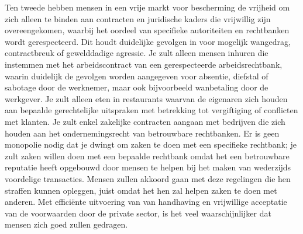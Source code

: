 \documentclass[
  a5paper,
  smalldemyvopaper,11pt,twoside,onecolumn,openright,extrafontsizes,
hidelinks]{memoir}
\begin{document}
Ten tweede hebben mensen in een vrije markt voor bescherming de vrijheid
om zich alleen te binden aan contracten en juridische kaders die
vrijwillig zijn overeengekomen, waarbij het oordeel van specifieke
autoriteiten en rechtbanken wordt gerespecteerd. Dit houdt duidelijke
gevolgen in voor mogelijk wangedrag, contractbreuk of gewelddadige
agressie. Je zult alleen mensen inhuren die instemmen met het
arbeidscontract van een gerespecteerde arbeidsrechtbank, waarin
duidelijk de gevolgen worden aangegeven voor absentie, diefstal of
sabotage door de werknemer, maar ook bijvoorbeeld wanbetaling door de
werkgever. Je zult alleen eten in restaurants waarvan de eigenaren zich
houden aan bepaalde gerechtelijke uitspraken met betrekking tot
vergiftiging of conflicten met klanten. Je zult enkel zakelijke
contracten aangaan met bedrijven die zich houden aan het
ondernemingsrecht van betrouwbare rechtbanken. Er is geen monopolie
nodig dat je dwingt om zaken te doen met een specifieke rechtbank; je
zult zaken willen doen met een bepaalde rechtbank omdat het een
betrouwbare reputatie heeft opgebouwd door mensen te helpen bij het
maken van wederzijds voordelige transacties. Mensen zullen akkoord gaan
met deze regelingen die hen straffen kunnen opleggen, juist omdat het
hen zal helpen zaken te doen met anderen. Met efficiënte uitvoering van
van handhaving en vrijwillige acceptatie van de voorwaarden door de
private sector, is het veel waarschijnlijker dat mensen zich goed zullen
gedragen.
\end{document}
